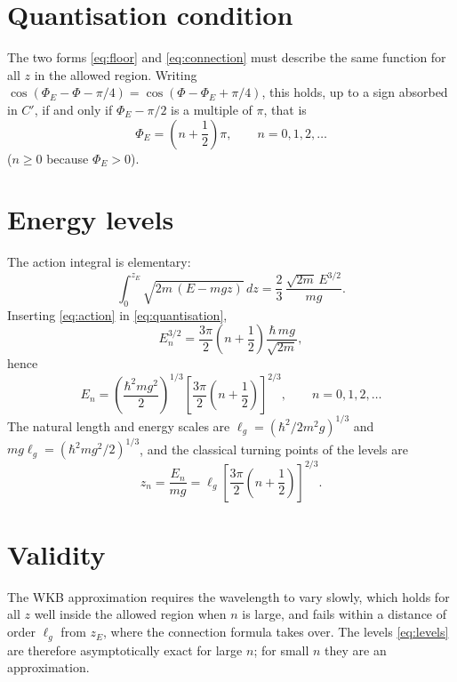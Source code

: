 \documentclass{article}
\begin{document}
\section{Quantisation condition}
The two forms \eqref{eq:floor} and \eqref{eq:connection} must describe the same function for all $z$ in the allowed region. Writing $\cos(\Phi_E - \Phi - \pi/4) = \cos(\Phi - \Phi_E + \pi/4)$, this holds, up to a sign absorbed in $C'$, if and only if $\Phi_E - \pi/2$ is a multiple of $\pi$, that is
\begin{equation}
  \Phi_E = \left(n + \frac12\right)\pi, \qquad n = 0, 1, 2, \dots
  \label{eq:quantisation}
\end{equation}
($n \ge 0$ because $\Phi_E > 0$).

\section{Energy levels}
The action integral is elementary:
\begin{equation}
  \int_0^{z_E} \sqrt{2m\,(E - mgz)}\,dz = \frac{2}{3}\,\frac{\sqrt{2m}\,E^{3/2}}{mg} .
  \label{eq:action}
\end{equation}
Inserting \eqref{eq:action} in \eqref{eq:quantisation},
\begin{equation}
  E_n^{3/2} = \frac{3\pi}{2}\left(n + \frac12\right)\frac{\hbar\, mg}{\sqrt{2m}} ,
  \label{eq:E32}
\end{equation}
hence
\begin{equation}
  E_n = \left(\frac{\hbar^2 m g^2}{2}\right)^{1/3}\left[\frac{3\pi}{2}\left(n + \frac12\right)\right]^{2/3}, \qquad n = 0, 1, 2, \dots
  \label{eq:levels}
\end{equation}
The natural length and energy scales are $\ell_g = (\hbar^2/2m^2g)^{1/3}$ and $mg\ell_g = (\hbar^2 m g^2/2)^{1/3}$, and the classical turning points of the levels are
\begin{equation}
  z_n = \frac{E_n}{mg} = \ell_g\left[\frac{3\pi}{2}\left(n + \frac12\right)\right]^{2/3} .
  \label{eq:heights}
\end{equation}

\section{Validity}
The WKB approximation requires the wavelength to vary slowly, which holds for all $z$ well inside the allowed region when $n$ is large, and fails within a distance of order $\ell_g$ from $z_E$, where the connection formula takes over. The levels \eqref{eq:levels} are therefore asymptotically exact for large $n$; for small $n$ they are an approximation.
\end{document}

